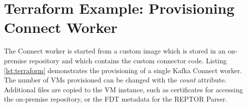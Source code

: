 \section{Terraform Example: Provisioning Connect Worker}
The Connect worker is started from a custom image which is stored in an on-premise repository and which contains the custom connector code. Listing \ref{lst:terraform} demonstrates the provisioning of a single Kafka Connect worker. The number of \ac{VM}s provisioned can be changed with the \textit{count} attribute. Additional files are copied to the \ac{VM} instance, such as certificates for accessing the on-premise repository, or the \ac{FDT} metadata for the \ac{REPTOR} Parser.

